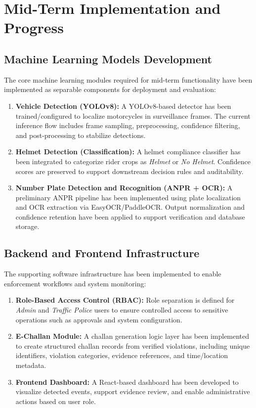 \documentclass[12pt,a4paper]{article}
\begin{document}
\section{Mid-Term Implementation and Progress}
\subsection{Machine Learning Models Development}
The core machine learning modules required for mid-term functionality have been implemented as separable components for deployment and evaluation:
\begin{enumerate}
  \item \textbf{Vehicle Detection (YOLOv8):} A YOLOv8-based detector has been trained/configured to localize motorcycles in surveillance frames. The current inference flow includes frame sampling, preprocessing, confidence filtering, and post-processing to stabilize detections.
  \item \textbf{Helmet Detection (Classification):} A helmet compliance classifier has been integrated to categorize rider crops as \textit{Helmet} or \textit{No Helmet}. Confidence scores are preserved to support downstream decision rules and auditability.
  \item \textbf{Number Plate Detection and Recognition (ANPR + OCR):} A preliminary ANPR pipeline has been implemented using plate localization and OCR extraction via EasyOCR/PaddleOCR. Output normalization and confidence retention have been applied to support verification and database storage.
\end{enumerate}

\subsection{Backend and Frontend Infrastructure}
The supporting software infrastructure has been implemented to enable enforcement workflows and system monitoring:
\begin{enumerate}
  \item \textbf{Role-Based Access Control (RBAC):} Role separation is defined for \textit{Admin} and \textit{Traffic Police} users to ensure controlled access to sensitive operations such as approvals and system configuration.
  \item \textbf{E-Challan Module:} A challan generation logic layer has been implemented to create structured challan records from verified violations, including unique identifiers, violation categories, evidence references, and time/location metadata.
  \item \textbf{Frontend Dashboard:} A React-based dashboard has been developed to visualize detected events, support evidence review, and enable administrative actions based on user role.
\end{enumerate}
\end{document}
